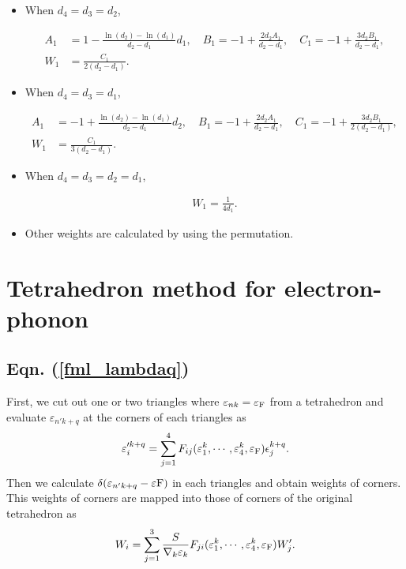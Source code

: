 \documentclass[12pt]{article}
\begin{document}
\begin{itemize}
\item When $d_4 = d_3 = d_2$,

\begin{align}
A_1 &= 1 - \frac{\ln(d_2) - \ln(d_1)}{d_2 - d_1} d_1,
\quad
B_1 = -1 + \frac{2 d_2 A_1}{d_2 - d_1},
\quad
C_1 = -1 + \frac{3 d_2 B_1}{d_2 - d_1},
\nonumber \\
W_1 &= \frac{C_1}{2 (d_2 - d_1)}.
\end{align}

\item When $d_4 = d_3 = d_1$,

\begin{align}
A_1 &= -1 + \frac{\ln(d_2) - \ln(d_1)}{d_2 - d_1} d_2,
\quad
B_1 = -1 + \frac{2 d_2 A_1}{d_2 - d_1},
\quad
C_1 = -1 + \frac{3 d_2 B_1}{2 (d_2 - d_1)},
\nonumber \\
W_1 &= \frac{C_1}{3 (d_2 - d_1)}.
\end{align}

\item When $d_4 = d_3 = d_2 = d_1$,

\begin{align}
W_1 = \frac{1}{4 d_1}.
\end{align}

\item Other weights are calculated by using the permutation.

\end{itemize}

\section{Tetrahedron method for electron-phonon}

\subsection{Eqn. (\ref{fml_lambdaq})}
First, we cut out one or two triangles where
$\varepsilon_{n k} = \varepsilon_{\rm F}$ from a tetrahedron
and evaluate $\varepsilon_{n' k+q}$ at the corners of each triangles as
\begin{align}
  \varepsilon'^{k+q}_{i} = \sum_{j=1}^4 F_{i j}(
  \varepsilon_1^{k}, \cdots, \varepsilon_{4}^{k}, \varepsilon_{\rm F}) 
  \epsilon_{j}^{k+q}.
\end{align}
Then we calculate $\delta(\varepsilon_{n' k+q} - \varepsilon{\rm F})$
in each triangles and obtain weights of corners.
This weights of corners are mapped into those of corners of the original tetrahedron as
\begin{align}
  W_{i} = \sum_{j=1}^3 \frac{S}{\nabla_k \varepsilon_k}F_{j i}(
  \varepsilon_{1}^k, \cdots, \varepsilon_{4}^k, \varepsilon_{\rm F}) 
  W'_{j}.
\end{align}
\end{document}
